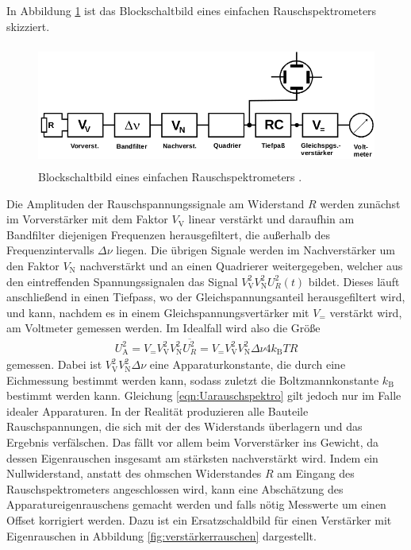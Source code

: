 In Abbildung \ref{fig:rauschspektro} ist das Blockschaltbild eines einfachen Rauschspektrometers skizziert.

\begin{figure}
  \centering
  \includegraphics[height=4cm]{Dickpics/rauschspektro.png}
  \caption{Blockschaltbild eines einfachen Rauschspektrometers \cite{anleitung}.}
  \label{fig:rauschspektro}
\end{figure}

Die Amplituden der Rauschspannungssignale am Widerstand $R$ werden zunächst im Vorverstärker mit dem Faktor $V_\text{V}$ linear verstärkt
und daraufhin am Bandfilter diejenigen Frequenzen herausgefiltert, die außerhalb des Frequenzintervalls $\Delta \nu$ liegen.
Die übrigen Signale werden im Nachverstärker um den Faktor $V_\text{N}$ nachverstärkt und an einen Quadrierer weitergegeben,
welcher aus den eintreffenden Spannungssignalen das Signal $V_\text{V}^2 V_\text{N}^2 U_R^2(t)$ bildet. Dieses läuft anschließend
in einen Tiefpass, wo der Gleichspannungsanteil herausgefiltert wird, und kann, nachdem es in einem Gleichspannungsvertärker
mit $V_=$ verstärkt wird, am Voltmeter gemessen werden. Im Idealfall wird also die Größe
\begin{align}
  U_\text{A}^2 = V_= V_\text{V}^2 V_\text{N}^2 \overline{U_R^2} = V_= V_\text{V}^2 V_\text{N}^2 \Delta \nu 4 k_\text{B} T R
  \label{eqn:Uarauschspektro}
\end{align}
gemessen. Dabei ist $V_\text{V}^2 V_\text{N}^2 \Delta \nu$ eine Apparaturkonstante, die durch eine Eichmessung bestimmt werden kann, sodass
zuletzt die Boltzmannkonstante $k_\text{B}$ bestimmt werden kann. Gleichung \eqref{eqn:Uarauschspektro} gilt jedoch nur im Falle
idealer Apparaturen. In der Realität produzieren alle Bauteile Rauschspannungen, die sich mit der des Widerstands überlagern und das
Ergebnis verfälschen. Das fällt vor allem beim Vorverstärker ins Gewicht, da dessen Eigenrauschen insgesamt am stärksten nachverstärkt wird.
Indem ein Nullwiderstand, anstatt des ohmschen Widerstandes $R$ am Eingang des Rauschspektrometers angeschlossen wird, kann eine Abschätzung
des Apparatureigenrauschens gemacht werden und falls nötig Messwerte um einen Offset korrigiert werden.
Dazu ist ein Ersatzschaldbild für einen Verstärker mit Eigenrauschen in Abbildung \ref{fig:verstärkerrauschen} dargestellt.


